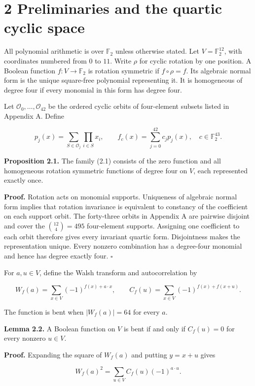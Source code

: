 \documentclass[pdflatex,sn-mathphys-num]{sn-jnl}
\begin{document}
\section*{2 Preliminaries and the quartic cyclic space}

All polynomial arithmetic is over $\mathbb F_2$ unless otherwise stated. Let $V=\mathbb F_2^{12}$, with coordinates numbered from $0$ to $11$. Write $\rho$ for cyclic rotation by one position. A Boolean function $f:V\to\mathbb F_2$ is rotation symmetric if $f\circ\rho=f$. Its algebraic normal form is the unique square-free polynomial representing it. It is homogeneous of degree four if every monomial in this form has degree four.

Let $\mathcal O_0,\ldots,\mathcal O_{42}$ be the ordered cyclic orbits of four-element subsets listed in Appendix A. Define

\[
p_j(x)=\sum_{S\in\mathcal O_j}\prod_{i\in S}x_i,
\qquad f_c(x)=\sum_{j=0}^{42}c_jp_j(x),\quad c\in\mathbb F_2^{43}. \tag{2.1}
\]

\textbf{Proposition 2.1.} The family (2.1) consists of the zero function and all homogeneous rotation symmetric functions of degree four on $V$, each represented exactly once.

\textbf{Proof.} Rotation acts on monomial supports. Uniqueness of algebraic normal form implies that rotation invariance is equivalent to constancy of the coefficient on each support orbit. The forty-three orbits in Appendix A are pairwise disjoint and cover the $\binom{12}{4}=495$ four-element supports. Assigning one coefficient to each orbit therefore gives every invariant quartic form. Disjointness makes the representation unique. Every nonzero combination has a degree-four monomial and hence has degree exactly four. \hfill$\square$

\enlargethispage{2pt}
For $a,u\in V$, define the Walsh transform and autocorrelation by

\[
W_f(a)=\sum_{x\in V}(-1)^{f(x)+a\cdot x},\qquad
C_f(u)=\sum_{x\in V}(-1)^{f(x)+f(x+u)}. \tag{2.2}
\]

The function is bent when $|W_f(a)|=64$ for every $a$.

\textbf{Lemma 2.2.} A Boolean function on $V$ is bent if and only if $C_f(u)=0$ for every nonzero $u\in V$.

\textbf{Proof.} Expanding the square of $W_f(a)$ and putting $y=x+u$ gives

\[
W_f(a)^2=\sum_{u\in V}C_f(u)(-1)^{a\cdot u}. \tag{2.3}
\]
\end{document}
